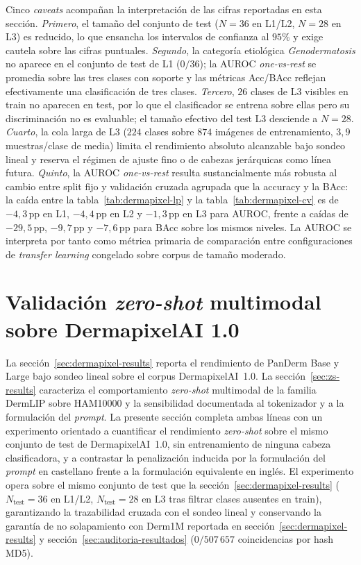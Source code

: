 Cinco \emph{caveats} acompañan la interpretación de las cifras
reportadas en esta sección. \textit{Primero}, el tamaño del conjunto
de test ($N = 36$ en L1/L2, $N = 28$ en L3) es reducido, lo que
ensancha los intervalos de confianza al $95\%$ y exige cautela
sobre las cifras puntuales. \textit{Segundo}, la categoría
etiológica \emph{Genodermatosis} no aparece en el conjunto de test
de L1 ($0 / 36$); la AUROC \emph{one-vs-rest} se promedia sobre
las tres clases con soporte y las métricas Acc/BAcc reflejan
efectivamente una clasificación de tres clases.
\textit{Tercero}, $26$ clases de L3 visibles en train no
aparecen en test, por lo que el clasificador se entrena sobre ellas
pero su discriminación no es evaluable; el tamaño efectivo del test
L3 desciende a $N = 28$. \textit{Cuarto}, la cola larga de L3
($224$ clases sobre $874$ imágenes de entrenamiento,
$3{,}9$ muestras/clase de media) limita el rendimiento absoluto
alcanzable bajo sondeo lineal y reserva el régimen de ajuste fino
o de cabezas jerárquicas como línea futura. \textit{Quinto}, la
AUROC \emph{one-vs-rest} resulta sustancialmente más robusta al
cambio entre split fijo y validación cruzada agrupada que la
accuracy y la BAcc: la caída entre la tabla~\ref{tab:dermapixel-lp}
y la tabla~\ref{tab:dermapixel-cv} es de $-4{,}3$\,pp en L1,
$-4{,}4$\,pp en L2 y $-1{,}3$\,pp en L3 para AUROC, frente a
caídas de $-29{,}5$\,pp, $-9{,}7$\,pp y $-7{,}6$\,pp para BAcc
sobre los mismos niveles. La AUROC se interpreta por tanto como
métrica primaria de comparación entre configuraciones de
\emph{transfer learning} congelado sobre corpus de tamaño moderado.

\section{Validación \emph{zero-shot} multimodal sobre DermapixelAI 1.0}
\label{sec:dermapixel-zs}

La sección~\ref{sec:dermapixel-results} reporta el rendimiento de
PanDerm Base y Large bajo sondeo lineal sobre el corpus
DermapixelAI~1.0. La sección~\ref{sec:zs-results} caracteriza el
comportamiento \emph{zero-shot} multimodal de la familia DermLIP
sobre HAM10000 y la sensibilidad documentada al tokenizador y a la
formulación del \emph{prompt}. La presente sección completa ambas
líneas con un experimento orientado a cuantificar el rendimiento
\emph{zero-shot} sobre el mismo conjunto de test de
DermapixelAI~1.0, sin entrenamiento de ninguna cabeza
clasificadora, y a contrastar la penalización inducida por la
formulación del \emph{prompt} en castellano frente a la
formulación equivalente en inglés. El experimento opera sobre el
mismo conjunto de test que la sección~\ref{sec:dermapixel-results}
($N_{\mathrm{test}} = 36$ en L1/L2, $N_{\mathrm{test}} = 28$ en L3
tras filtrar clases ausentes en train), garantizando la
trazabilidad cruzada con el sondeo lineal y conservando la garantía
de no solapamiento con Derm1M reportada en
secci\'on~\ref{sec:dermapixel-results} y
secci\'on~\ref{sec:auditoria-resultados} ($0 / 507\,657$
coincidencias por hash MD5).

